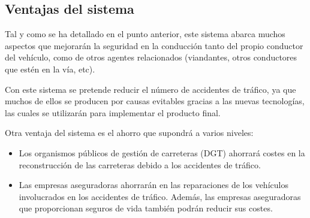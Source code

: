 \subsection{Ventajas del sistema}
\par Tal y como se ha detallado en el punto anterior, este sistema abarca muchos aspectos que mejorarán la seguridad en la conducción tanto del propio conductor del vehículo, como de otros agentes relacionados (viandantes, otros conductores que estén en la vía, etc).
\par Con este sistema se pretende reducir el número de accidentes de tráfico, ya que muchos de ellos se producen por causas evitables gracias a las nuevas tecnologías, las cuales se utilizarán para implementar el producto final.
\par Otra ventaja del sistema es el ahorro que supondrá a varios niveles:
\begin{itemize}[-]
\item Los organismos públicos de gestión de carreteras (DGT) ahorrará costes en  la reconstrucción de las carreteras debido a los accidentes de tráfico.
\item Las empresas aseguradoras ahorrarán en las reparaciones de los vehículos involucrados en los accidentes de tráfico. Además, las empresas aseguradoras que proporcionan seguros de vida también podrán reducir sus costes.
\end{itemize}
